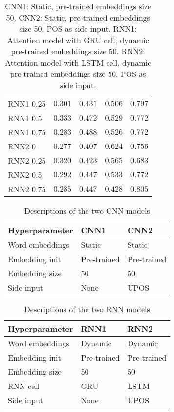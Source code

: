 \begin{table}
\begin{tabular}{lrrrr}
    RNN1 0.25 & $0.301$ & $0.431$ & $0.506$ & $0.797$ \\
    RNN1 0.5 & $0.333$ & $0.472$ & $0.529$ & $0.772$ \\
    RNN1 0.75 & $0.283$ & $\mathbf{0.488}$ & $0.526$ & $0.772$ \\
    \midrule
    RNN2 0 & $0.277$ & $0.407$ & $\mathbf{0.624}$ & $0.756$ \\
    RNN2 0.25 & $0.320$ & $0.423$ & $0.565$ & $0.683$ \\
    RNN2 0.5 & $0.292$ & $0.447$ & $0.533$ & $0.772$ \\
    RNN2 0.75 & $0.285$ & $0.447$ & $0.428$ & $\mathbf{0.805}$ \\
    \bottomrule
  \end{tabular}
  \caption{CNN1: Static, pre-trained embeddings size 50.
           CNN2: Static, pre-trained embeddings size 50, POS as side input.
           RNN1: Attention model with GRU cell, dynamic pre-trained
           embeddings size 50.
           RNN2: Attention model with LSTM cell, dynamic pre-trained
           embeddings size 50, POS as side input.}
  \label{tab:multitask-results}
\end{table}

\begin{table}
  \centering
  \begin{tabular}{lll}
    \toprule
    Hyperparameter & CNN1 & CNN2 \\
    \midrule
    Word embeddings & Static & Static \\
    Embedding init & Pre-trained & Pre-trained \\
    Embedding size & 50 & 50 \\
    Side input & None & UPOS \\
    \bottomrule
  \end{tabular}
  \caption{Descriptions of the two CNN models}
  \label{tab:cnn-parameters}
\end{table}

\begin{table}
  \centering
  \begin{tabular}{lll}
    \toprule
    Hyperparameter & RNN1 & RNN2 \\
    \midrule
    Word embeddings & Dynamic & Dynamic \\
    Embedding init & Pre-trained & Pre-trained \\
    Embedding size & 50 & 50 \\
    RNN cell & GRU & LSTM \\
    Side input & None & UPOS \\
    \bottomrule
  \end{tabular}
  \caption{Descriptions of the two RNN models}
  \label{tab:rnn-parameters}
\end{table}

